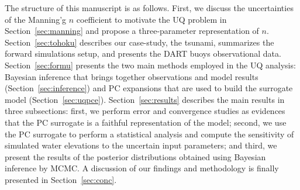 The structure of this manuscript is as follows. First, we discuss the uncertainties 
of the Manning'g $n$ coefficient to motivate the UQ problem in Section~\ref{sec:manning}
and propose a three-parameter representation of $n$. 
Section~\ref{sec:tohoku} describes our case-study, the \tohoku tsunami,
summarizes the forward simulations setup, and presents the DART buoys observational data. 
Section~\ref{sec:formu} presents the two main methods employed in the UQ analysis:
Bayesian inference that brings together observations 
and model results (Section~\ref{sec:inference}) 
and PC expansions that are used to build the surrogate model (Section~\ref{sec:uqpce}). Section~\ref{sec:results} describes the main results in 
three subsections: first, we perform error and convergence studies
as evidences that the PC surrogate is a faithful 
representation of the \geoclaw model; second, we use the PC surrogate to 
perform a statistical analysis and compute the  sensitivity of simulated water elevations
to the uncertain input parameters; and third, we present the results of the
posterior distributions obtained using Bayesian inference by MCMC. A discussion of our findings and methodology is finally presented in Section~\ref{sec:conc}.

